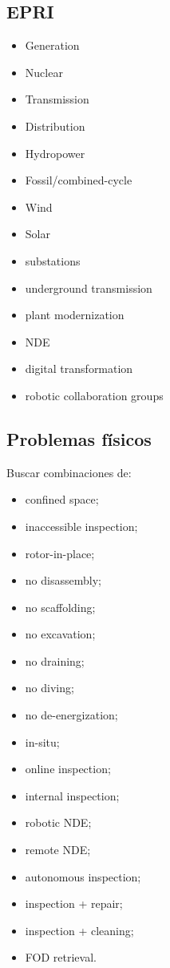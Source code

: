 \documentclass[11pt,a4paper]{article}
\begin{document}
\subsection*{EPRI}
\begin{itemize}
\item Generation
\item Nuclear
\item Transmission
\item Distribution
\item Hydropower
\item Fossil/combined-cycle
\item Wind
\item Solar
\item substations
\item underground transmission
\item plant modernization
\item NDE
\item digital transformation
\item robotic collaboration groups
\end{itemize}


\subsection*{Problemas físicos}
Buscar combinaciones de:

\begin{itemize}
\item confined space;
\item inaccessible inspection;
\item rotor-in-place;
\item no disassembly;
\item no scaffolding;
\item no excavation;
\item no draining;
\item no diving;
\item no de-energization;
\item in-situ;
\item online inspection;
\item internal inspection;
\item robotic NDE;
\item remote NDE;
\item autonomous inspection;
\item inspection + repair;
\item inspection + cleaning;
\item FOD retrieval.
\end{itemize}
\end{document}
